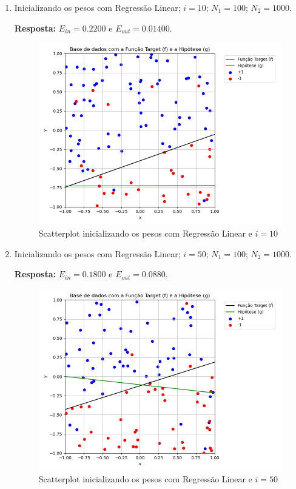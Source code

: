 \begin{enumerate}
\begin{enumerate}
        \item Inicializando os pesos com Regressão Linear; $i = 10$; $N_1 = 100$; $N_2 = 1000$.
        
        \textbf{Resposta:} $E_{in} = 0.2200$ e $E_{out} = 0.01400$.

        \begin{figure}[H]
            \caption{Scatterplot inicializando os pesos com Regressão Linear e $i = 10$}
               \centering
               \includegraphics[width=12cm]{pocket_i10_reglin.png}
        \end{figure}

        \item Inicializando os pesos com Regressão Linear; $i = 50$; $N_1 = 100$; $N_2 = 1000$.

        \textbf{Resposta:} $E_{in} = 0.1800$ e $E_{out} = 0.0880$.

        \begin{figure}[H]
            \caption{Scatterplot inicializando os pesos com Regressão Linear e $i = 50$}
               \centering
               \includegraphics[width=12cm]{pocket_i50_reglin.png}
        \end{figure}

    \end{enumerate}

    
\end{enumerate}